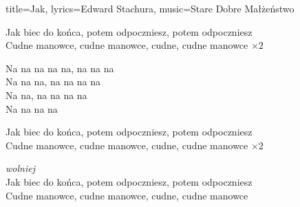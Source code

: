 \begin{song}{title={Jak}, lyrics={Edward Stachura}, music={Stare Dobre Małżeństwo}}
\begin{verse*}
        Jak biec do końca, potem odpoczniesz, potem odpoczniesz \\
        Cudne manowce, cudne manowce, cudne, cudne manowce $\times 2$
    \end{verse*}
    \begin{verse*}
        Na na na na na, na na na \\
        Na na na, na na na na \\
        Na na, na na na na \\
        Na na na na
    \end{verse*}
    \begin{verse*}
        Jak biec do końca, potem odpoczniesz, potem odpoczniesz \\
        Cudne manowce, cudne manowce, cudne, cudne manowce $\times 2$
    \end{verse*}
    \begin{verse*}
        \textit{wolniej} \\
        Jak biec do końca, potem odpoczniesz, potem odpoczniesz \\
        Cudne manowce, cudne manowce, cudne, cudne manowce
    \end{verse*}
\end{song}

